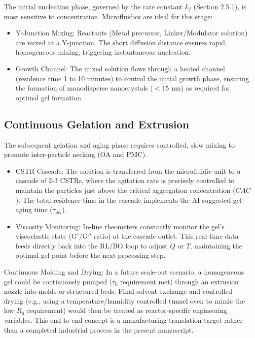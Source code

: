 \documentclass[12pt,a4paper]{article}
\begin{document}
The initial nucleation phase, governed by the rate constant $k_f$ (Section 2.5.1), is most sensitive to concentration. Microfluidics are ideal for this stage:
\begin{itemize}
    \item Y-Junction Mixing: Reactants (Metal precursor, Linker/Modulator solution) are mixed at a Y-junction. The short diffusion distance ensures rapid, homogeneous mixing, triggering instantaneous nucleation.
    \item Growth Channel: The mixed solution flows through a heated channel (residence time 1 to 10 minutes) to control the initial growth phase, ensuring the formation of monodisperse nanocrystals ($<15 \text{ nm}$) as required for optimal gel formation.
\end{itemize}

\subsection{Continuous Gelation and Extrusion}

The subsequent gelation and aging phase requires controlled, slow mixing to promote inter-particle necking ($\text{OA}$ and $\text{PMC}$).
\begin{itemize}
    \item CSTR Cascade: The solution is transferred from the microfluidic unit to a cascade of 2-3 CSTRs, where the agitation rate is precisely controlled to maintain the particles just above the critical aggregation concentration ($CAC$). The total residence time in the cascade implements the AI-suggested gel aging time ($\tau_{gel}$).
    \item Viscosity Monitoring: In-line rheometers constantly monitor the gel's viscoelastic state ($\text{G}'/\text{G}''$ ratio) at the cascade outlet. This real-time data feeds directly back into the RL/BO loop to adjust $Q$ or $T$, maintaining the optimal gel point before the next processing step.
\end{itemize}
Continuous Molding and Drying:
In a future scale-out scenario, a homogeneous gel could be continuously pumped ($\tau_0$ requirement met) through an extrusion nozzle into molds or structured beds. Final solvent exchange and controlled drying (e.g., using a temperature/humidity controlled tunnel oven to mimic the low $R_d$ requirement) would then be treated as reactor-specific engineering variables. This end-to-end concept is a manufacturing translation target rather than a completed industrial process in the present manuscript.
\end{document}
